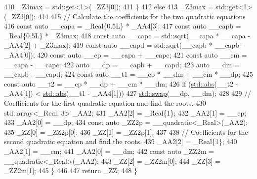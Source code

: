 \begin{DoxyCode}
410               \_Z3max = std::get<1>(\_ZZ3[0]);
411             \}
412           \textcolor{keywordflow}{else}
413             \_Z3max = std::get<1>(\_ZZ3[0]);
414 
415           \textcolor{comment}{// Calculate the coefficients for the two quadratic equations}
416           \textcolor{keyword}{const} \textcolor{keyword}{auto} \_\_capa = \_Real\{0.5L\} * \_AA4[3];
417           \textcolor{keyword}{const} \textcolor{keyword}{auto} \_\_capb = \_Real\{0.5L\} * \_Z3max;
418           \textcolor{keyword}{const} \textcolor{keyword}{auto} \_\_capc = std::sqrt(\_\_capa * \_\_capa - \_AA4[2] + \_Z3max);
419           \textcolor{keyword}{const} \textcolor{keyword}{auto} \_\_capd = std::sqrt(\_\_capb * \_\_capb - \_AA4[0]);
420           \textcolor{keyword}{const} \textcolor{keyword}{auto} \_\_cp = \_\_capa + \_\_capc;
421           \textcolor{keyword}{const} \textcolor{keyword}{auto} \_\_cm = \_\_capa - \_\_capc;
422           \textcolor{keyword}{auto} \_\_dp = \_\_capb + \_\_capd;
423           \textcolor{keyword}{auto} \_\_dm = \_\_capb - \_\_capd;
424           \textcolor{keyword}{const} \textcolor{keyword}{auto} \_\_t1 = \_\_cp * \_\_dm + \_\_cm * \_\_dp;
425           \textcolor{keyword}{const} \textcolor{keyword}{auto} \_\_t2 = \_\_cp * \_\_dp + \_\_cm * \_\_dm;
426           \textcolor{keywordflow}{if} (\hyperlink{namespace____gnu__cxx_ab9eb9db3560f504f8cd25a71bcb6ead5}{std::abs}(\_\_t2 - \_AA4[1]) < \hyperlink{namespace____gnu__cxx_ab9eb9db3560f504f8cd25a71bcb6ead5}{std::abs}(\_\_t1 - \_AA4[1]))
427             \hyperlink{namespace____gnu__cxx_a10d002d78eb10d846416335ca9599c7a}{std::swap}(\_\_dp, \_\_dm);
428 
429           \textcolor{comment}{// Coefficients for the first quadratic equation and find the roots.}
430           std::array<\_Real, 3> \_AA2;
431           \_AA2[2] = \_Real\{1\};
432           \_AA2[1] = \_\_cp;
433           \_AA2[0] = \_\_dp;
434           \textcolor{keyword}{const} \textcolor{keyword}{auto} \_ZZ2p = \_\_quadratic<\_Real>(\_AA2);
435           \_ZZ[0] = \_ZZ2p[0];
436           \_ZZ[1] = \_ZZ2p[1];
437 
438           \textcolor{comment}{// Coefficients for the second quadratic equation and find the roots.}
439           \_AA2[2] = \_Real\{1\};
440           \_AA2[1] = \_\_cm;
441           \_AA2[0] = \_\_dm;
442           \textcolor{keyword}{const} \textcolor{keyword}{auto} \_ZZ2m = \_\_quadratic<\_Real>(\_AA2);
443           \_ZZ[2] = \_ZZ2m[0];
444           \_ZZ[3] = \_ZZ2m[1];
445         \}
446 
447       \textcolor{keywordflow}{return} \_ZZ;
448     \}
\end{DoxyCode}
\mbox{\label{namespace____gnu__cxx_a6dbbccdfca9b8a8dffdf99432986f0c9}} 
